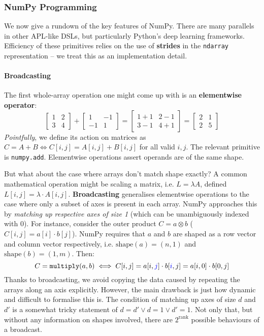 \subsubsection{NumPy Programming} 

We now give a rundown of the key features of NumPy. There are many parallels in other APL-like DSLs, but particularly Python's deep learning frameworks. Efficiency of these primitives relies on the use of \textbf{strides} \cite{harris2020array} in the \texttt{ndarray} representation -- we treat this as an implementation detail.

\paragraph{Broadcasting}

The first whole-array operation one might come up with is an \textbf{elementwise operator}:
$$ \begin{bmatrix} 1 & 2 \\ 3 & 4 \end{bmatrix} 
+ \begin{bmatrix}1 & -1 \\ -1 & 1 \end{bmatrix}
= \begin{bmatrix}1 + 1 & 2 - 1 \\ 3 - 1 & 4 + 1 \end{bmatrix}
= \begin{bmatrix}2 & 1 \\ 2 & 5 \end{bmatrix} $$
\textit{Pointfully}, we define its action on matrices as $C = A + B \Leftrightarrow C[i, j] = A[i, j] + B[i, j]$ for all valid $i, j$. The relevant primitive is \texttt{numpy.add}. Elementwise operations assert operands are of the same shape.

But what about the case where arrays don't match shape exactly? A common mathematical operation might be scaling a matrix, i.e. $L = \lambda A$, defined $L[i, j] = \lambda \cdot A[i, j]$. \textbf{Broadcasting} generalises elementwise operations to the case where only a subset of axes is present in each array. NumPy approaches this by \textit{matching up respective axes of size 1} (which can be unambiguously indexed with $0$). For instance, consider the outer product $C = a \otimes b$ ($C[i, j] = a[i] \cdot b[j] $). NumPy requires that $a$ and $b$ are shaped as a row vector and column vector respectively, i.e. $\mathrm{shape}(a) = (n, 1)$ and $\mathrm{shape}(b) = (1, m)$. Then:
$$ C = \texttt{multiply}(a, b) \iff C[i, j] = a[i, {\color{blue} j}] \cdot b[{\color{blue} i}, j] = a[i, 0] \cdot b[0, j] $$
Thanks to broadcasting, we avoid copying the data caused by repeating the arrays along an axis explicitly. However, the main drawback is just how dynamic and difficult to formalise this is. The condition of matching up axes of size $d$ and $d'$ is a somewhat tricky statement of $d = d' \lor d = 1 \lor d' = 1 $.
Not only that, but without any information on shapes involved, there are $2^{\mathrm{rank}}$ possible behaviours of a broadcast.

